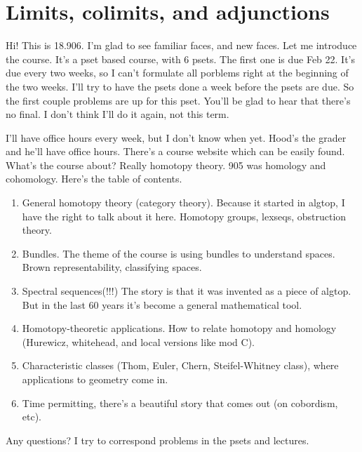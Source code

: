 \chapter{Limits, colimits, and adjunctions}
Hi! This is 18.906. I'm glad to see familiar faces, and new faces. Let me introduce the course. It's a pset based course, with 6 psets. The first one is due Feb 22. It's due every two weeks, so I can't formulate all porblems right at the beginning of the two weeks. I'll try to have the psets done a week before the psets are due. So the first couple problems are up for this pset. You'll be glad to hear that there's no final. I don't think I'll do it again, not this term.

I'll have office hours every week, but I don't know when yet. Hood's the grader and he'll have office hours. There's a course website which can be easily found. What's the course about? Really homotopy theory. 905 was homology and cohomology. Here's the table of contents.
\begin{enumerate}
    \item General homotopy theory (category theory). Because it started in algtop, I have the right to talk about it here. Homotopy groups, lexseqs, obstruction theory.
    \item Bundles. The theme of the course is using bundles to understand spaces. Brown representability, classifying spaces.
    \item Spectral sequences(!!!) The story is that it was invented as a piece of algtop. But in the last 60 years it's become a general mathematical tool.
    \item Homotopy-theoretic applications. How to relate homotopy and homology (Hurewicz, whitehead, and local versions like mod C).
    \item Characteristic classes (Thom, Euler, Chern, Steifel-Whitney class), where applications to geometry come in.
    \item Time permitting, there's a beautiful story that comes out (on cobordism, etc).
\end{enumerate}
Any questions? I try to correspond problems in the psets and lectures.
